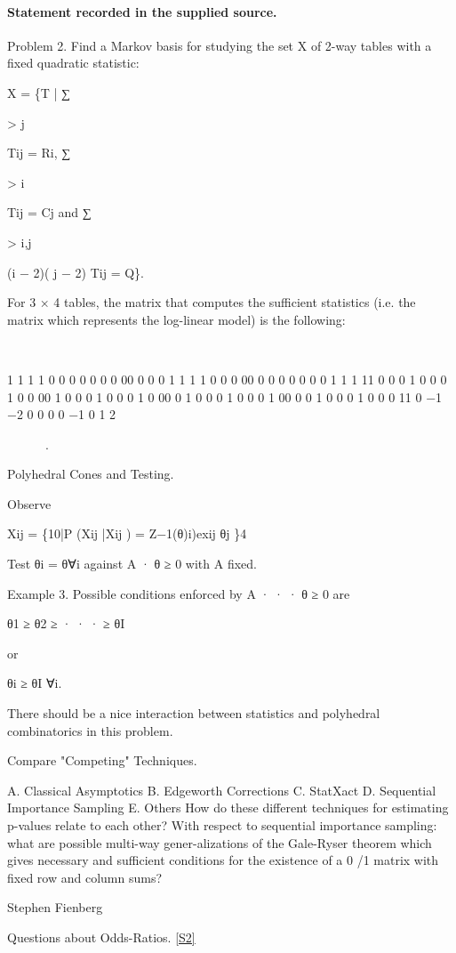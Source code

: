 \documentclass[11pt]{article}
\begin{document}
\paragraph{Statement recorded in the supplied source.}
Problem 2. Find a Markov basis for studying the set X of 2-way tables with a fixed quadratic statistic:

X = \{T | ∑

> j

Tij = Ri, ∑

> i

Tij = Cj and ∑

> i,j

(i − 2)( j − 2) Tij = Q\}.

For 3 × 4 tables, the matrix that computes the sufficient statistics (i.e. the matrix which represents the log-linear model) is the following:



1 1 1 1 0 0 0 0 0 0 0 00 0 0 0 1 1 1 1 0 0 0 00 0 0 0 0 0 0 0 1 1 1 11 0 0 0 1 0 0 0 1 0 0 00 1 0 0 0 1 0 0 0 1 0 00 0 1 0 0 0 1 0 0 0 1 00 0 0 1 0 0 0 1 0 0 0 11 0 −1 −2 0 0 0 0 −1 0 1 2

.

Polyhedral Cones and Testing.

Observe

Xij = \{10|P (Xij |Xij ) = Z−1(θ)i)exij θj \}4

Test θi = θ∀i against A · θ ≥ 0 with A fixed.

Example 3. Possible conditions enforced by A · · · θ ≥ 0 are

θ1 ≥ θ2 ≥ · · · ≥ θI

or

θi ≥ θI ∀i.

There should be a nice interaction between statistics and polyhedral combinatorics in this problem.

Compare "Competing" Techniques.

A. Classical Asymptotics B. Edgeworth Corrections C. StatXact D. Sequential Importance Sampling E. Others How do these different techniques for estimating p-values relate to each other? With respect to sequential importance sampling: what are possible multi-way gener-alizations of the Gale-Ryser theorem which gives necessary and sufficient conditions for the existence of a 0 /1 matrix with fixed row and column sums?

Stephen Fienberg

Questions about Odds-Ratios. \href{https://aimath.org/WWN/compalgstat/compalgstat.pdf}{[S2]}
\end{document}
